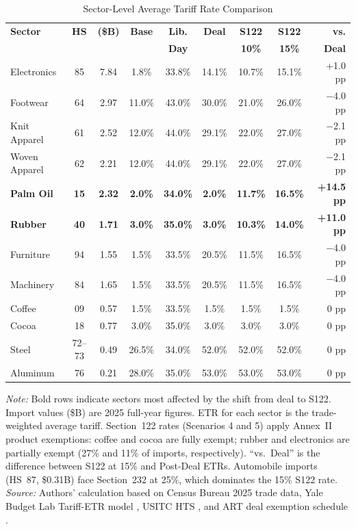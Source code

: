 \documentclass[12pt,a4paper]{article}
\begin{document}
\begin{table}[htbp]
\centering
\caption{Sector-Level Average Tariff Rate Comparison}
\small
\begin{tabular}{lcccccccr}
\toprule
\textbf{Sector} & \textbf{HS} & \textbf{(\$B)} & \textbf{Base} & \textbf{Lib.} & \textbf{Deal} & \textbf{S122} & \textbf{S122} & \textbf{vs.} \\
& & & & \textbf{Day} & & \textbf{10\%} & \textbf{15\%} & \textbf{Deal} \\
\midrule
Electronics & 85 & 7.84 & 1.8\% & 33.8\% & 14.1\% & 10.7\% & 15.1\% & +1.0 pp \\
Footwear & 64 & 2.97 & 11.0\% & 43.0\% & 30.0\% & 21.0\% & 26.0\% & $-$4.0 pp \\
Knit Apparel & 61 & 2.52 & 12.0\% & 44.0\% & 29.1\% & 22.0\% & 27.0\% & $-$2.1 pp \\
Woven Apparel & 62 & 2.21 & 12.0\% & 44.0\% & 29.1\% & 22.0\% & 27.0\% & $-$2.1 pp \\
\textbf{Palm Oil} & \textbf{15} & \textbf{2.32} & \textbf{2.0\%} & \textbf{34.0\%} & \textbf{2.0\%} & \textbf{11.7\%} & \textbf{16.5\%} & \textbf{+14.5 pp} \\
\textbf{Rubber} & \textbf{40} & \textbf{1.71} & \textbf{3.0\%} & \textbf{35.0\%} & \textbf{3.0\%} & \textbf{10.3\%} & \textbf{14.0\%} & \textbf{+11.0 pp} \\
Furniture & 94 & 1.55 & 1.5\% & 33.5\% & 20.5\% & 11.5\% & 16.5\% & $-$4.0 pp \\
Machinery & 84 & 1.65 & 1.5\% & 33.5\% & 20.5\% & 11.5\% & 16.5\% & $-$4.0 pp \\
Coffee & 09 & 0.57 & 1.5\% & 33.5\% & 1.5\% & 1.5\% & 1.5\% & 0 pp \\
Cocoa & 18 & 0.77 & 3.0\% & 35.0\% & 3.0\% & 3.0\% & 3.0\% & 0 pp \\
Steel & 72--73 & 0.49 & 26.5\% & 34.0\% & 52.0\% & 52.0\% & 52.0\% & 0 pp \\
Aluminum & 76 & 0.21 & 28.0\% & 35.0\% & 53.0\% & 53.0\% & 53.0\% & 0 pp \\
\bottomrule
\end{tabular}
\par\smallskip
\begin{minipage}{\linewidth}
\footnotesize
\textit{Note:} Bold rows indicate sectors most affected by the shift from deal to S122. Import values (\$B) are 2025 full-year figures. ETR for each sector is the trade-weighted average tariff. Section~122 rates (Scenarios 4 and 5) apply Annex~II product exemptions: coffee and cocoa are fully exempt; rubber and electronics are partially exempt (27\% and 11\% of imports, respectively). ``vs.\ Deal'' is the difference between S122 at 15\% and Post-Deal ETRs. Automobile imports (HS~87, \$0.31B) face Section~232 at 25\%, which dominates the 15\% S122 rate.\\
\textit{Source:} Authors' calculation based on Census Bureau 2025 trade data, Yale Budget Lab Tariff-ETR model \cite{yalebudgetlab_model}, USITC HTS \cite{usitc_hts}, and ART deal exemption schedule \cite{art2026}.
\end{minipage}
\label{tab:sector impacts}
\end{table}
\end{document}

